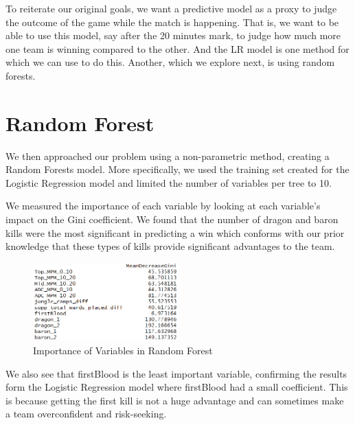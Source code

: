 \documentclass[runningheads]{llncs}
\begin{document}
	To reiterate our original goals, we want a predictive model as a proxy to judge the outcome of the game while the match is happening. That is, we want to be able to use this model, say after the 20 minutes mark, to judge how much more one team is winning compared to the other. And the LR model is one method for which we can use to do this. Another, which we explore next, is using random forests.
	
	\section{Random Forest}
	
	We then approached our problem using a non-parametric method, creating a Random Forests 
model. More specifically, we used the training set created for the Logistic Regression model and limited the number of variables per tree to 10. 

	We measured the importance of each variable by looking at each variable’s impact on the Gini coefficient. We found that the number of dragon and baron kills were the most significant in predicting a win which conforms with our prior knowledge that these types of kills provide significant advantages to the team.
	
	\begin{figure}[!htb]
		\centering
		\includegraphics[width=0.5\textwidth]{images/rf_importance.png}
		\caption{Importance of Variables in Random Forest}
	\end{figure}
	
	We also see that firstBlood is the least important variable, confirming the results form the Logistic Regression model where firstBlood had a small coefficient. This is because getting the first kill is not a huge advantage and can sometimes make a team overconfident and risk-seeking.
	
\end{document}
